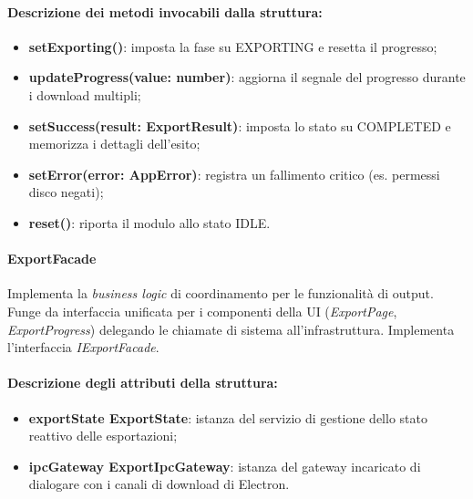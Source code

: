 \paragraph{Descrizione dei metodi invocabili dalla struttura:}
\begin{itemize}
\item \textbf{setExporting()}: imposta la fase su EXPORTING e resetta il progresso;
\item \textbf{updateProgress(value: number)}: aggiorna il segnale del progresso durante i download multipli;
\item \textbf{setSuccess(result: ExportResult)}: imposta lo stato su COMPLETED e memorizza i dettagli dell'esito;
\item \textbf{setError(error: AppError)}: registra un fallimento critico (es. permessi disco negati);
\item \textbf{reset()}: riporta il modulo allo stato IDLE.
\end{itemize}

\paragraph{ExportFacade}
Implementa la \textit{business logic} di coordinamento per le funzionalità di output. Funge da interfaccia unificata per i componenti della UI (\textit{ExportPage}, \textit{ExportProgress}) delegando le chiamate di sistema all'infrastruttura. Implementa l'interfaccia \textit{IExportFacade}.

\paragraph{Descrizione degli attributi della struttura:}
\begin{itemize}
\item \textbf{exportState ExportState}: istanza del servizio di gestione dello stato reattivo delle esportazioni;
\item \textbf{ipcGateway ExportIpcGateway}: istanza del gateway incaricato di dialogare con i canali di download di Electron.
\end{itemize}

